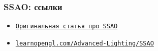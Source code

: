 \documentclass[10pt]{beamer}
\begin{document}
\begin{frame}[fragile]
\frametitle{SSAO: ссылки}
\begin{itemize}
\item \href{https://artis.inrialpes.fr/Membres/Olivier.Hoel/ssao/nVidiaHSAO/ScreenSpaceAO.pdf}{\texttt{Оригинальная статья про SSAO}}
\item \href{https://learnopengl.com/Advanced-Lighting/SSAO}{\texttt{learnopengl.com/Advanced-Lighting/SSAO}}
\end{itemize}
\end{frame}
\end{document}

